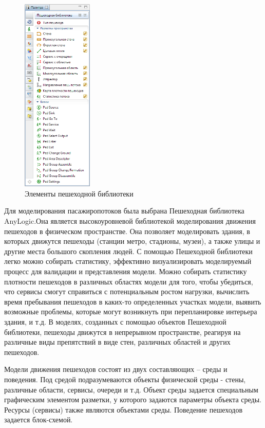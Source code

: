 \documentclass[12pt]{article}
\begin{document}
 \begin{figure}
  	\begin{center}
  	  	\includegraphics[width=0.3\textwidth]{ped_lib.png}
 	 \end{center}
	  	\caption{Элементы пешеходной библиотеки}
\end{figure}

Для моделирования пасажиропотоков была выбрана Пешеходная библиотека AnyLogic.Она является высокоуровневой библиотекой моделирования движения пешеходов в физическом пространстве. Она позволяет моделировать здания, в которых движутся пешеходы (станции метро, стадионы, музеи), а также улицы и другие места большого скопления людей. С помощью Пешеходной библиотеки легко можно собирать статистику, эффективно визуализировать моделируемый процесс для валидации и представления модели. Можно собирать статистику плотности пешеходов в различных областях модели для того, чтобы убедиться, что сервисы смогут справиться с потенциальным ростом нагрузки, вычислить время пребывания пешеходов в каких-то определенных участках модели, выявить возможные проблемы, которые могут возникнуть при перепланировке интерьера здания, и т.д. В моделях, созданных с помощью объектов Пешеходной библиотеки, пешеходы движутся в непрерывном пространстве, реагируя на различные виды препятствий в виде стен, различных областей и других пешеходов. 

 Модели движения пешеходов состоят из двух составляющих – среды и поведения. Под средой подразумеваются объекты физической среды - стены, различные области, сервисы, очереди и т.д. Объект среды задается специальным графическим элементом разметки, у которого задаются параметры объекта среды. Ресурсы (сервисы) также являются объектами среды. Поведение пешеходов задается блок-схемой. 
\end{document}
